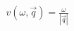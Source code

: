 \documentclass[preview]{standalone}
\begin{document}
\begin{align*}
v(\omega,\vec{q}) = \frac{\omega}{|\vec{q}|}
\end{align*}
\end{document}
